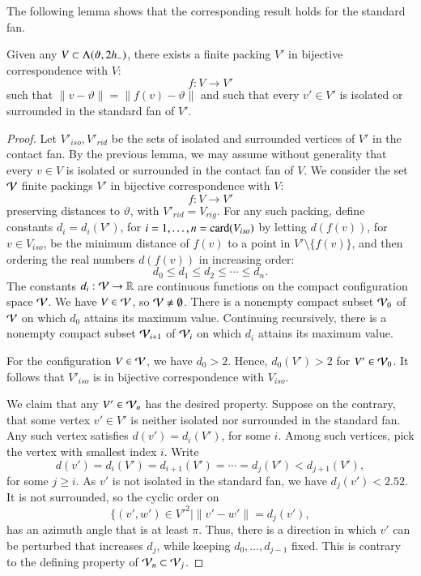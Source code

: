 The following lemma shows that the corresponding result
holds for the standard fan.

\begin{lemma}\label{lemma:surrounded}  
Given any $V\subset \Lambda(\vartheta,2{h_-})$,
there exists a finite packing $V'$ 
in bijective correspondence with $V$:
$$
f:V\to V'
$$
such that $\|v-\vartheta\| = \|f(v)-\vartheta\|$ and
such that every $v'\in V'$
is isolated or surrounded in the standard fan of $V'$.
\end{lemma}

\begin{proof}  
Let $V'_{iso},V'_{rid}$ be the
sets of isolated and surrounded vertices of $V'$ in the contact
fan.
By the previous lemma, we may assume
without generality that every $v\in V$ is isolated
or surrounded in the contact fan of $V$.    
We consider the set ${\mathcal V}$ finite
packings $V'$ in bijective correspondence with $V$:
$$
f:V\to V'
$$
preserving distances to $\vartheta$, with $V'_{rid}=V_{rig}$.
For any such packing, define constants $d_i=d_i(V')$,
for $i=1,\ldots,n={\operatorname{card}}(V_{iso})$ by letting 
$d(f(v))$, for $v\in V_{iso}$, 
be the minimum distance of $f(v)$ to a point
in $V'\setminus \{f(v)\}$, and then ordering the real numbers $d(f(v))$ in increasing order:
$$
d_0 \le d_1 \le d_2 \le \cdots \le d_n.
$$
The constants $d_i:{\mathcal V}\to\mathbb{R}$ are continuous functions on the compact configuration space ${\mathcal V}$.
We have $V\in {\mathcal V}$, so ${\mathcal V}\ne\emptyset$.
There is a nonempty 
compact subset ${\mathcal V}_0$ of ${\mathcal V}$ on which
$d_0$ attains its maximum value. Continuing recursively,
there is a nonempty compact subset ${\mathcal V}_{i+1}$ of
${\mathcal V}_{i}$ on which $d_i$ attains its maximum value.

For the configuration $V\in {\mathcal V}$, we have $d_0 >2$.
Hence, $d_0(V')>2$ for $V'\in{\mathcal V}_0$.  It follows
that $V'_{iso}$ is in bijective correspondence with
$V_{iso}$.

We claim that any $V'\in {\mathcal V}_n$ has the desired property.
Suppose on the contrary, that some vertex $v'\in V'$
is neither isolated nor surrounded in the standard fan.  
Any such vertex satisfies $d(v')=d_i(V')$, for some $i$.
Among such vertices, pick the vertex with smallest index
$i$.  Write 
$$
d(v') = d_i(V') = d_{i+1}(V') =\cdots= d_j(V') < d_{j+1}(V'),
$$
for some $j\ge i$.  As $v'$ is not isolated in the
standard fan, we have $d_j(v') < 2.52$.  It is not surrounded,
so the cyclic order on
$$
\{(v',w')\in V'^2 \mid \|v'-w'\| = d_j(v'),
$$
has an azimuth angle that is at least $\pi$.
Thus, there is a direction in which $v'$ can be perturbed
that increases $d_j$, while keeping $d_0,\ldots,d_{j-1}$
fixed.  This is contrary to the defining property of
${\mathcal V}_n\subset{\mathcal V}_j$.
\end{proof}


